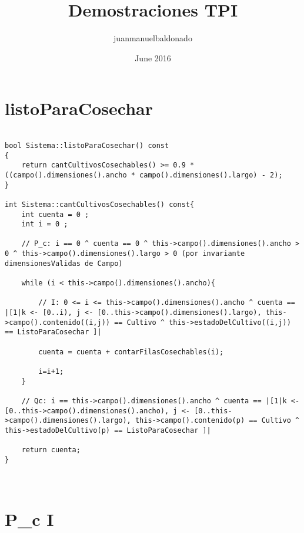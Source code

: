 \documentclass{article}
\title{Demostraciones TPI}
\author{juanmanuelbaldonado }
\date{June 2016}
\begin{document}
\maketitle

\section{listoParaCosechar}

\begin{lstlisting}

bool Sistema::listoParaCosechar() const
{
	return cantCultivosCosechables() >= 0.9 * ((campo().dimensiones().ancho * campo().dimensiones().largo) - 2);
}

int Sistema::cantCultivosCosechables() const{
	int cuenta = 0 ;
	int i = 0 ;

	// P_c: i == 0 ^ cuenta == 0 ^ this->campo().dimensiones().ancho > 0 ^ this->campo().dimensiones().largo > 0 (por invariante dimensionesValidas de Campo)

	while (i < this->campo().dimensiones().ancho){
		
		// I: 0 <= i <= this->campo().dimensiones().ancho ^ cuenta == |[1|k <- [0..i), j <- [0..this->campo().dimensiones().largo), this->campo().contenido((i,j)) == Cultivo ^ this->estadoDelCultivo((i,j)) == ListoParaCosechar ]|	
	
		cuenta = cuenta + contarFilasCosechables(i);

		i=i+1;
	}
	
	// Qc: i == this->campo().dimensiones().ancho ^ cuenta == |[1|k <- [0..this->campo().dimensiones().ancho), j <- [0..this->campo().dimensiones().largo), this->campo().contenido(p) == Cultivo ^ this->estadoDelCultivo(p) == ListoParaCosechar ]|
	
	return cuenta;
}



\end{lstlisting}







\maketitle

\section{P_c \Rightarrow I}
\end{document}
